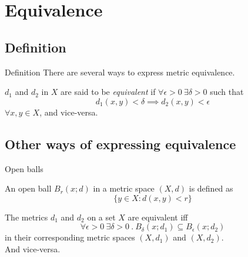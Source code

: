\documentclass{beamer}
\begin{document}
    \section{Equivalence}

    \subsection{Definition}

    \begin{frame}{Definition}
        There are several ways to express metric equivalence.
        \begin{definition}{}
            $d_1$ and $d_2$ in $X$ are said to be \emph{equivalent} if
            $\forall \epsilon > 0 \ \exists \delta > 0$ such that
            $$d_1(x,y) < \delta \implies d_2(x,y) < \epsilon$$
            $\forall x,y \in X$, and vice-versa.
        \end{definition}
    \end{frame}

    \subsection{Other ways of expressing equivalence}
    \begin{frame}{Open balls}

        \begin{definition}{}
            An open ball $B_r(x;d)$ in a metric space $(X,d)$ is defined as
            $$\{y \in X : d(x,y) < r\}$$
        \end{definition}
        \pause
        \begin{theorem}{}
            The metrics $d_1$ and $d_2$ on a set $X$ are equivalent iff
            $$\forall \epsilon > 0 \ \exists \delta > 0 \ . \ B_\delta(x;d_1) \subseteq B_\epsilon(x;d_2)$$
            in their corresponding metric spaces $(X,d_1)$ and $(X,d_2)$.\\
            And vice-versa.
        \end{theorem}

    \end{frame}
\end{document}

